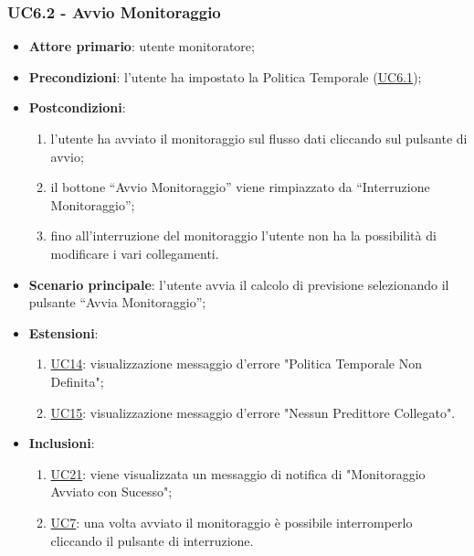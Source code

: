 	\subsubsection{UC6.2 - Avvio Monitoraggio}
		\begin{itemize}
			\item\textbf{Attore primario}: utente monitoratore;
			\item\textbf{Precondizioni}: l’utente ha impostato la Politica Temporale (\hyperref[par:UC6.1]{UC6.1});
			\item\textbf{Postcondizioni}: 
				\begin{enumerate}
					\item l’utente ha avviato il monitoraggio sul flusso dati cliccando sul pulsante di avvio;
					\item il bottone “Avvio Monitoraggio” viene rimpiazzato da “Interruzione Monitoraggio”;
					\item fino all’interruzione del monitoraggio l’utente non ha la possibilità di modificare i vari collegamenti.
				\end{enumerate}
			\item\textbf{Scenario principale}: l’utente avvia il calcolo di previsione selezionando il pulsante “Avvia Monitoraggio”; 
			\item\textbf{Estensioni}: 
				\begin{enumerate} 
					\item \hyperref[par:UC14]{UC14}: visualizzazione messaggio d’errore "Politica Temporale Non Definita";
					\item \hyperref[par:UC15]{UC15}: visualizzazione messaggio d’errore "Nessun Predittore Collegato".
				\end{enumerate}
			\item\textbf{Inclusioni}: 
				\begin{enumerate} 
					\item \hyperref[par:UC21]{UC21}: viene visualizzata un messaggio di notifica di "Monitoraggio Avviato con Sucesso";
					\item \hyperref[par:UC7]{UC7}: una volta avviato il monitoraggio è possibile interromperlo cliccando il pulsante di interruzione.
				\end{enumerate}	
		\end{itemize}	

	\label{par:UC6.3}
